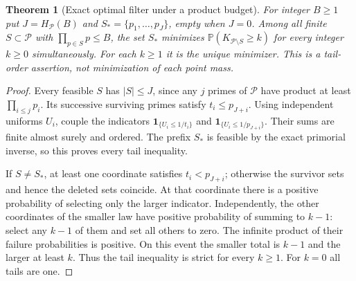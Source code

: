 \documentclass[11pt]{article}
\newtheorem{theorem}{Theorem}[section]
\theoremstyle{definition}
\begin{document}
\begin{theorem}[Exact optimal filter under a product budget]
\label{thm:thin-prime-product-filter-optimality}
For integer $B\ge1$ put $J=H_{\mathcal P}(B)$ and
$S_*=\{p_1,\ldots,p_J\}$, empty when $J=0$.
Among all finite $S\subset\mathcal P$ with $\prod_{p\in S}p\le B$,
the set $S_*$ minimizes
$\mathbb P(K_{\mathcal P\setminus S}\ge k)$ for every integer
$k\ge0$ simultaneously.
For each $k\ge1$ it is the unique minimizer.
This is a tail-order assertion, not minimization of each point mass.
\end{theorem}

\begin{proof}
Every feasible $S$ has $|S|\le J$, since any $j$ primes
of $\mathcal P$ have product at least $\prod_{i\le j}p_i$.
Its successive surviving primes satisfy $t_i\le p_{J+i}$.
Using independent uniforms $U_i$, couple the indicators
$\mathbf1_{\{U_i\le1/t_i\}}$ and
$\mathbf1_{\{U_i\le1/p_{J+i}\}}$.
Their sums are finite almost surely and ordered.
The prefix $S_*$ is feasible by the exact primorial inverse,
so this proves every tail inequality.

If $S\ne S_*$, at least one coordinate satisfies $t_i<p_{J+i}$;
otherwise the survivor sets and hence the deleted sets coincide.
At that coordinate there is a positive probability of selecting
only the larger indicator.
Independently, the other coordinates of the smaller law have
positive probability of summing to $k-1$: select any $k-1$
of them and set all others to zero.
The infinite product of their failure probabilities is positive.
On this event the smaller total is $k-1$ and the larger at least $k$.
Thus the tail inequality is strict for every $k\ge1$.
For $k=0$ all tails are one.
\end{proof}
\end{document}
